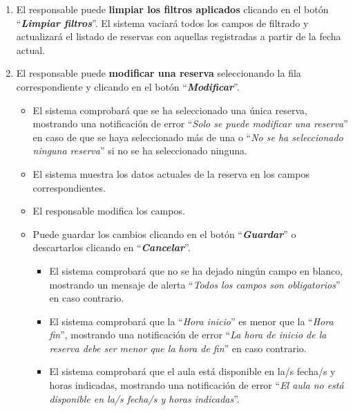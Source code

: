 \begin{enumerate}
        \item El responsable puede \textbf{limpiar los filtros aplicados} clicando en el botón ``\textbf{\textit{Limpiar filtros}}''. El sistema vaciará todos los campos de filtrado y actualizará el listado de reservas con aquellas registradas a partir de la fecha actual.
        
        \item El responsable puede \textbf{modificar una reserva} seleccionando la fila correspondiente y clicando en el botón ``\textbf{\textit{Modificar}}''.
        
            \begin{itemize}
            \tightlist
                \item El sistema comprobará que se ha seleccionado una única reserva, mostrando una notificación de error ``\textit{Solo se puede modificar una reserva}'' en caso de que se haya seleccionado más de una o ``\textit{No se ha seleccionado ninguna reserva}'' si no se ha seleccionado ninguna.
                
                \item El sistema muestra los datos actuales de la reserva en los campos correspondientes.
                
                \item El responsable modifica los campos.
                
                \item Puede guardar los cambios clicando en el botón ``\textbf{\textit{Guardar}}'' o descartarlos clicando en ``\textbf{\textit{Cancelar}}''.
                    \begin{itemize}
                    \tightlist
                        \item El sistema comprobará que no se ha dejado ningún campo en blanco, mostrando un mensaje de alerta ``\textit{Todos los campos son obligatorios}'' en caso contrario.
                        
                        \item El sistema comprobará que la ``\textit{Hora inicio}'' es menor que la ``\textit{Hora fin}'', mostrando una notificación de error ``\textit{La hora de inicio de la reserva debe ser menor que la hora de fin}'' en caso contrario.
                        
                        \item El sistema comprobará que el aula está disponible en la/s fecha/s y horas indicadas, mostrando una notificación de error ``\textit{El aula no está disponible en la/s fecha/s y horas indicadas}''.
                    \end{itemize}
            \end{itemize}
        

\end{enumerate}
